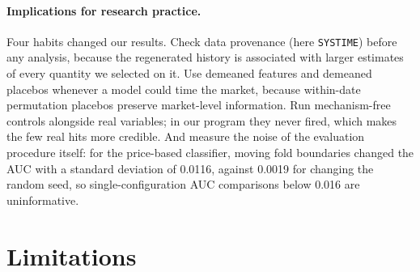 \paragraph{Implications for research practice.} Four habits changed our results. Check data provenance (here \texttt{SYSTIME}) before any analysis, because the regenerated history is associated with larger estimates of every quantity we selected on it. Use demeaned features and demeaned placebos whenever a model could time the market, because within-date permutation placebos preserve market-level information. Run mechanism-free controls alongside real variables; in our program they never fired, which makes the few real hits more credible. And measure the noise of the evaluation procedure itself: for the price-based classifier, moving fold boundaries changed the AUC with a standard deviation of 0.0116, against 0.0019 for changing the random seed, so single-configuration AUC comparisons below 0.016 are uninformative.

\section{Limitations}\label{sec:limits}

